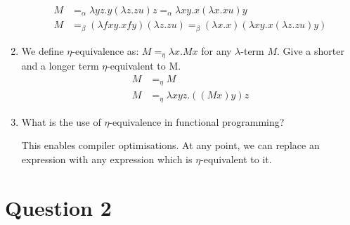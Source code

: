 \documentclass[10pt,\jkfside,a4paper]{article}
\begin{document}
\begin{enumerate}[label=(\alph*)]
\begin{align*}
M &
=_{\alpha} \lambda yz.y(\lambda z.zu)z
=_{\alpha} \lambda xy.x(\lambda x. xu)y \\
M &
=_{\beta} (\lambda fxy. xfy)(\lambda z. zu)
=_{\beta} (\lambda x. x)(\lambda xy. x(\lambda z. zu)y)
\end{align*}

\item We define $\eta$-equivalence as: $M=_\eta \lambda x.Mx$ for any
$\lambda$-term $M$. Give a shorter and a longer term $\eta$-equivalent to M\@.
\begin{align*}
M &=_{\eta} M \\
M &=_{\eta} \lambda xyz. ((M x)y)z
\end{align*}

\item What is the use of $\eta$-equivalence in functional programming?

This enables compiler optimisations. At any point, we can replace an
expression with any expression which is $\eta$-equivalent to it.

\end{enumerate}

\section{Question 2}
\end{document}
